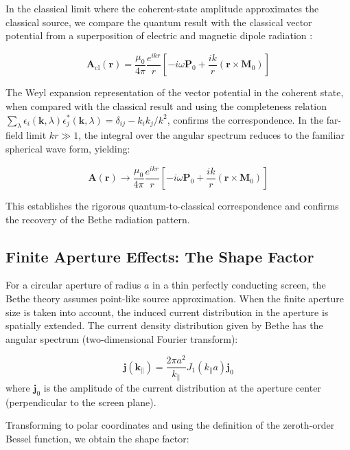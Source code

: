 \documentclass[%
 reprint,
 amsmath,amssymb,
 aps,
 floatfix,
]{revtex4-2}
\begin{document}
In the classical limit where the coherent-state amplitude approximates the classical source, we compare the quantum result with the classical vector potential from a superposition of electric and magnetic dipole radiation \cite{Jackson1998}:

\begin{equation}
\mathbf{A}_\text{cl}(\mathbf{r}) = \frac{\mu_0}{4\pi}\frac{e^{ikr}}{r}\left[-i\omega\mathbf{P}_0 + \frac{ik}{r}(\mathbf{r}\times\mathbf{M}_0)\right]
\end{equation}

The Weyl expansion representation of the vector potential in the coherent state, when compared with the classical result and using the completeness relation $\sum_\lambda\epsilon_i(\mathbf{k},\lambda)\epsilon_j^*(\mathbf{k},\lambda)=\delta_{ij} - k_ik_j/k^2$, confirms the correspondence. In the far-field limit $kr \gg 1$, the integral over the angular spectrum reduces to the familiar spherical wave form, yielding:

\begin{equation}
\mathbf{A}(\mathbf{r}) \rightarrow \frac{\mu_0}{4\pi}\frac{e^{ikr}}{r}\left[-i\omega\mathbf{P}_0 + \frac{ik}{r}(\mathbf{r}\times\mathbf{M}_0)\right]
\end{equation}

This establishes the rigorous quantum-to-classical correspondence and confirms the recovery of the Bethe radiation pattern.

\subsection{Finite Aperture Effects: The Shape Factor}

For a circular aperture of radius $a$ in a thin perfectly conducting screen, the Bethe theory assumes point-like source approximation. When the finite aperture size is taken into account, the induced current distribution in the aperture is spatially extended. The current density distribution given by Bethe \cite{Bethe1944} has the angular spectrum (two-dimensional Fourier transform):

\begin{equation}
\mathbf{j}(\mathbf{k}_\parallel) = \frac{2\pi a^2}{k_\parallel}J_1(k_\parallel a)\mathbf{j}_0
\end{equation}
where $\mathbf{j}_0$ is the amplitude of the current distribution at the aperture center (perpendicular to the screen plane).

Transforming to polar coordinates and using the definition of the zeroth-order Bessel function, we obtain the shape factor:
\end{document}
